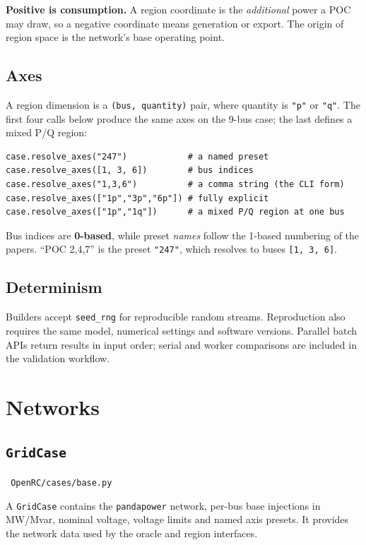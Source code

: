 \documentclass[11pt,a4paper]{report}
\newcommand{\trap}[1]{\begin{warnbox}#1\end{warnbox}}
\newcommand{\code}[1]{\texttt{\small #1}}
\newcommand{\file}[1]{\texttt{\small\color{nbgrey} #1}}
\begin{document}
\textbf{Positive is consumption.} A region coordinate is the \emph{additional}
power a POC may draw, so a negative coordinate means generation or export. The
origin of region space is the network's base operating point.

\section{Axes}

A region dimension is a \code{(bus, quantity)} pair, where quantity is
\code{"p"} or \code{"q"}. The first four calls below produce the same axes
on the 9-bus case; the last defines a mixed P/Q region:

\begin{lstlisting}
case.resolve_axes("247")            # a named preset
case.resolve_axes([1, 3, 6])        # bus indices
case.resolve_axes("1,3,6")          # a comma string (the CLI form)
case.resolve_axes(["1p","3p","6p"]) # fully explicit
case.resolve_axes(["1p","1q"])      # a mixed P/Q region at one bus
\end{lstlisting}

\trap{Bus indices are \textbf{0-based}, while preset \emph{names} follow the
1-based numbering of the papers. ``POC 2,4,7'' is the preset \code{"247"}, which
resolves to buses \code{[1, 3, 6]}.}

\section{Determinism}

Builders accept \code{seed\_rng} for reproducible random streams. Reproduction
also requires the same model, numerical settings and software versions.
Parallel batch APIs return results in input order; serial and worker
comparisons are included in the validation workflow.

\chapter{Networks}
\label{ch:cases}

\section{\code{GridCase}}

\file{OpenRC/cases/base.py}

A \code{GridCase} contains the \code{pandapower} network, per-bus base
injections in MW/Mvar, nominal voltage, voltage limits and named axis presets.
It provides the network data used by the oracle and region interfaces.
\end{document}
